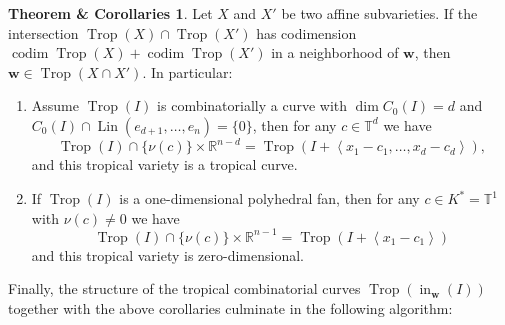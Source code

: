\documentclass[
  paper=a4,
  titlepage,
  bibliography=totoc,
  listof=totoc,
  pagesize=pdftex
]{scrartcl}
\numberwithin{figure}{section}
\numberwithin{equation}{section}
\numberwithin{table}{section}
\newcommand*\setR{\mathds{R}}
\newcommand*\setT{\mathds{T}}
\newcommand*\ideal[1]{\left\langle #1 \right\rangle}
\let\vec\mathbf
\DeclareMathOperator{\Trop}{Trop}
\DeclareMathOperator{\initial}{in}
\DeclareMathOperator{\Lin}{Lin}
\DeclareMathOperator{\codim}{codim}
\theoremstyle{definition}
\newtheorem{thmCorollary}[definition]{Theorem \& Corollaries}
\numberwithin{definition}{section}
\begin{document}
\begin{thmCorollary} \label{thmc:tropInt}
  Let $X$ and $X'$ be two affine subvarieties. If the intersection $\Trop(X) \cap
  \Trop(X')$ has codimension $\codim\Trop(X) + \codim\Trop(X')$ in a neighborhood of $\vec
  w$, then $\vec w \in \Trop(X\cap X')$. In particular:
  \begin{enumerate}
    \item Assume $\Trop(I)$ is combinatorially a curve with $\dim C_0(I) = d$ and
      $C_0(I)\cap \Lin(e_{d+1}, \dots, e_n) = \{0\}$, then for any $c \in \setT^d$ we have
      \[
        \Trop(I) \cap \{\nu(c)\} \times \setR^{n-d} = \Trop(I + \ideal{x_1-c_1, \dots,
        x_d-c_d}),
      \]
      and this tropical variety is a tropical curve.
      \label{thmc:i}
    \item If $\Trop(I)$ is a one-dimensional polyhedral fan, then for any $c \in K^* =
      \setT^1$ with $\nu(c)\neq0$ we have
      \[
        \Trop(I) \cap \{\nu(c)\} \times \setR^{n-1} = \Trop(I + \ideal{x_1-c_1})
      \]
      and this tropical variety is zero-dimensional.
      \label{thmc:ii}
  \end{enumerate}
\end{thmCorollary}

Finally, the structure of the tropical combinatorial curves $\Trop(\initial_{\vec w}(I))$ together
with the above corollaries culminate in the following algorithm:
\end{document}
